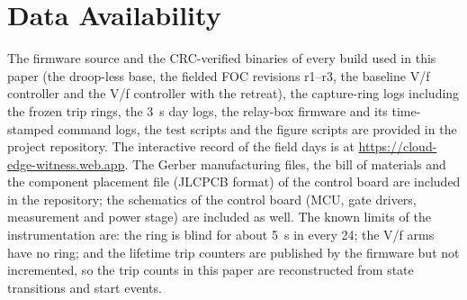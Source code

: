 \documentclass[journal]{IEEEtran}
\begin{document}
\section*{Data Availability}
The firmware source and the CRC-verified binaries of every build used in this paper (the droop-less base, the fielded FOC revisions r1--r3, the baseline V/f controller and the V/f controller with the retreat), the capture-ring logs including the frozen trip rings, the 3~s day logs, the relay-box firmware and its time-stamped command logs, the test scripts and the figure scripts are provided in the project repository. The interactive record of the field days is at \url{https://cloud-edge-witness.web.app}. The Gerber manufacturing files, the bill of materials and the component placement file (JLCPCB format) of the control board are included in the repository; the schematics of the control board (MCU, gate drivers, measurement and power stage) are included as well. The known limits of the instrumentation are: the ring is blind for about 5~s in every 24; the V/f arms have no ring; and the lifetime trip counters are published by the firmware but not incremented, so the trip counts in this paper are reconstructed from state transitions and start events.
\end{document}
